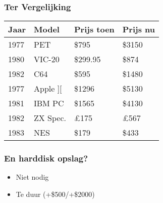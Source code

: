 \documentclass[aspectratio=43]{uva-inf-presentation}
\begin{document}
\begin{frame}
\frametitle{Ter Vergelijking}

\begin{tabular}{|l|l|l|l|}
\hline Jaar & Model & Prijs toen & Prijs nu \\ \hline
1977 & PET & \$795 & \$3150 \\
1980 & VIC-20 & \$299.95 & \$874 \\
1982 & C64 & \$595 & \$1480 \\ \hline
1977 & Apple ][ & \$1296 & \$5130 \\
1981 & IBM PC & \$1565 & \$4130 \\
1982 & ZX Spec. & \pounds 175 & \pounds 567 \\ \hline
1983 & NES & \$179 & \$433 \\ \hline
\end{tabular}


\end{frame}


\begin{frame}
\frametitle{En harddisk opslag?}

\begin{itemize}
\item Niet nodig
\item Te duur (+\$500/+\$2000)
\end{itemize}

\end{frame}
\end{document}
